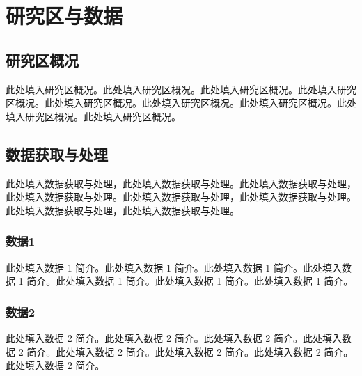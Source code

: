 \chapter{研究区与数据}

\section{研究区概况}
此处填入研究区概况。此处填入研究区概况。此处填入研究区概况。此处填入研究区概况。此处填入研究区概况。此处填入研究区概况。此处填入研究区概况。此处填入研究区概况。此处填入研究区概况。

\section{数据获取与处理}
此处填入数据获取与处理，此处填入数据获取与处理。此处填入数据获取与处理，此处填入数据获取与处理。此处填入数据获取与处理，此处填入数据获取与处理。此处填入数据获取与处理，此处填入数据获取与处理。

\subsection{数据1}
此处填入数据 1 简介。此处填入数据 1 简介。此处填入数据 1 简介。此处填入数据 1 简介。此处填入数据 1 简介。此处填入数据 1 简介。此处填入数据 1 简介。

\subsection{数据2}
此处填入数据 2 简介。此处填入数据 2 简介。此处填入数据 2 简介。此处填入数据 2 简介。此处填入数据 2 简介。此处填入数据 2 简介。此处填入数据 2 简介。此处填入数据 2 简介。